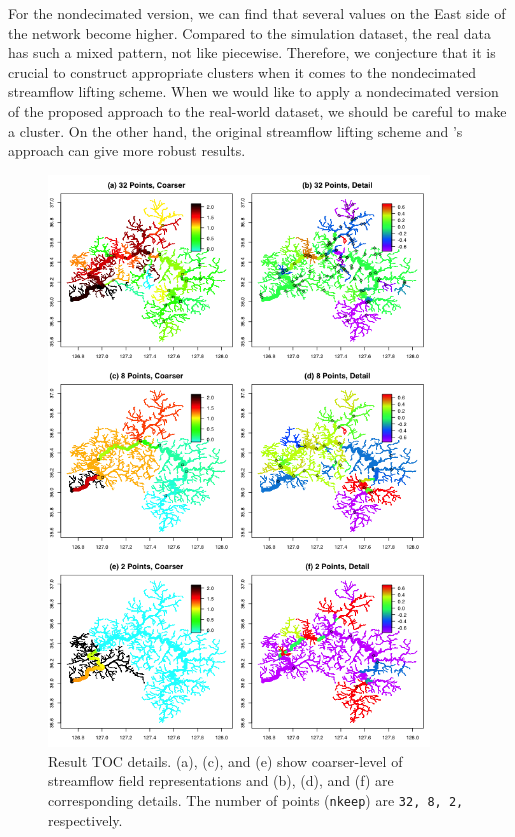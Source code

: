 \documentclass[11pt,titlepage]{article}
\begin{document}
For the nondecimated version, we can find that several values on the East side of the network become higher. Compared to the simulation dataset, the real data has such a mixed pattern, not like piecewise. Therefore, we conjecture that it is crucial to construct appropriate clusters when it comes to the nondecimated streamflow lifting scheme. When we would like to apply a nondecimated version of the proposed approach to the real-world dataset, we should be careful to make a cluster. On the other hand, the original streamflow lifting scheme and \cite{ODonnell2014}'s approach can give more robust results.

\begin{figure}
	\centering\includegraphics[width=0.9\textwidth]{Stream_result/result_TOC_detail2(rev).png}
	\vspace{-3mm}
	\caption{Result TOC details. (a), (c), and (e) show coarser-level of streamflow field representations and (b), (d), and (f) are corresponding details. The number of points (\texttt{nkeep}) are \texttt{32, 8, 2,} respectively.}
	\label{fig:resultBODdetail}
\end{figure}
\end{document}
